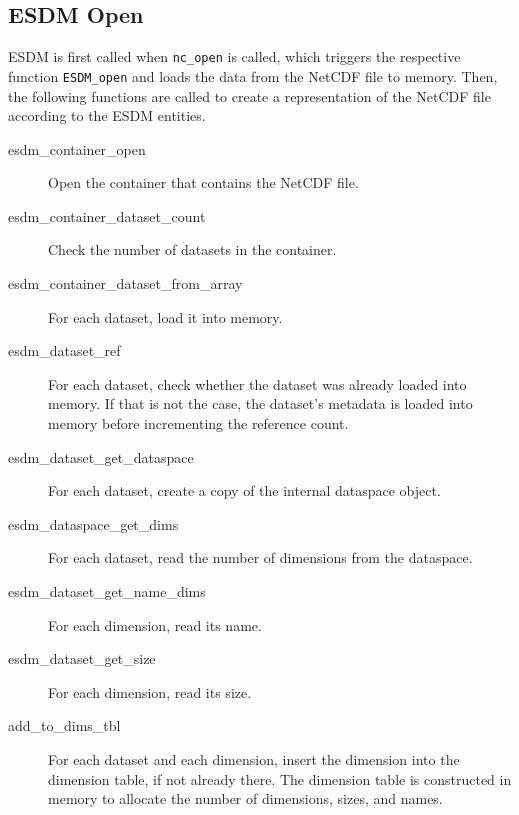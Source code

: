 \subsection{ESDM Open}

ESDM is first called when \texttt{nc\_open} is called, which triggers the respective function \texttt{ESDM\_open} and loads the data from the NetCDF file to memory.
Then, the following functions are called to create a representation of the NetCDF file according to the ESDM entities.

\begin{description}

\item[esdm\_container\_open]

Open the container that contains the NetCDF file.

\item[esdm\_container\_dataset\_count]

Check the number of datasets in the container.

\item[esdm\_container\_dataset\_from\_array]

For each dataset, load it into memory.

\item[esdm\_dataset\_ref]

For each dataset, check whether the dataset was already loaded into memory.
If that is not the case, the dataset's metadata is loaded into memory before incrementing the reference count.

\item[esdm\_dataset\_get\_dataspace]

For each dataset, create a copy of the internal dataspace object.

\item[esdm\_dataspace\_get\_dims]

For each dataset, read the number of dimensions from the dataspace.

\item[esdm\_dataset\_get\_name\_dims]

For each dimension, read its name.

\item[esdm\_dataset\_get\_size]

For each dimension, read its size.

\item[add\_to\_dims\_tbl]

For each dataset and each dimension, insert the dimension into the dimension table, if not already there. The dimension table is constructed in memory to allocate the number of dimensions, sizes, and names.


\end{description}
